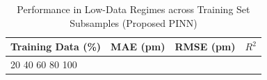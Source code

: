 \begin{table}[h]
\centering
\caption{Performance in Low-Data Regimes across Training Set Subsamples (Proposed PINN)}
\label{tab:small_data}
\begin{tabular}{lccc}
\hline
\textbf{Training Data (\%)} & \textbf{MAE (pm)} & \textbf{RMSE (pm)} & \textbf{$R^2$} \\ \hline
20%
40%
60%
80%
100%
\hline
\end{tabular}
\end{table}